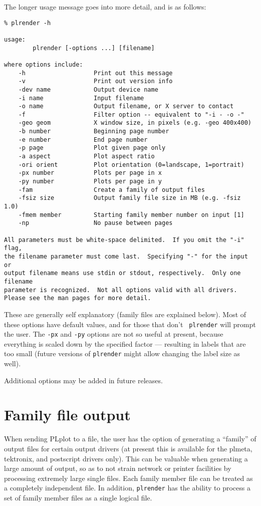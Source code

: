 The longer usage message goes into more detail, and is as follows:
\begin{verbatim}
% plrender -h

usage:
        plrender [-options ...] [filename]

where options include:
    -h                   Print out this message
    -v                   Print out version info
    -dev name            Output device name
    -i name              Input filename
    -o name              Output filename, or X server to contact
    -f                   Filter option -- equivalent to "-i - -o -"
    -geo geom            X window size, in pixels (e.g. -geo 400x400)
    -b number            Beginning page number
    -e number            End page number
    -p page              Plot given page only
    -a aspect            Plot aspect ratio
    -ori orient          Plot orientation (0=landscape, 1=portrait)
    -px number           Plots per page in x
    -py number           Plots per page in y
    -fam                 Create a family of output files
    -fsiz size           Output family file size in MB (e.g. -fsiz 1.0)
    -fmem member         Starting family member number on input [1]
    -np                  No pause between pages

All parameters must be white-space delimited.  If you omit the "-i" flag,
the filename parameter must come last.  Specifying "-" for the input or
output filename means use stdin or stdout, respectively.  Only one filename
parameter is recognized.  Not all options valid with all drivers.
Please see the man pages for more detail.
\end{verbatim}
These are generally self explanatory (family files are explained below).
Most of these options have default values, and for those that don't {\tt
plrender} will prompt the user.  The {\tt -px} and {\tt -py} options are
not so useful at present, because everything is scaled down by the
specified factor --- resulting in labels that are too small (future
versions of {\tt plrender} might allow changing the label size as well). 

Additional options may be added in future releases.

\section{Family file output}\label{sec:family}

When sending PLplot to a file, the user has the option of generating a
``family'' of output files for certain output drivers (at present this
is available for the plmeta, tektronix, and postscript drivers only).
This can be valuable when generating a large amount of output, so as to not
strain network or printer facilities by processing extremely large single
files.  Each family member file can be treated as a completely independent
file.  In addition, {\tt plrender} has the ability to process a set of
family member files as a single logical file.

